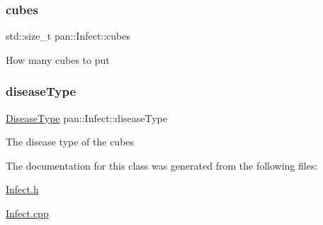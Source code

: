 \subsubsection{\texorpdfstring{cubes}{cubes}}
{\footnotesize\ttfamily std\+::size\+\_\+t pan\+::\+Infect\+::cubes}

How many cubes to put \mbox{\label{classpan_1_1_infect_ad0a1d175916afcaf0f1050edf6536a97}} 
\subsubsection{\texorpdfstring{disease\+Type}{diseaseType}}
{\footnotesize\ttfamily \hyperlink{namespacepan_a48851b51b0aef3f0e1be80df5031d9d7}{Disease\+Type} pan\+::\+Infect\+::disease\+Type}

The disease type of the cubes 

The documentation for this class was generated from the following files\+:\begin{DoxyCompactItemize}
\item 
\hyperlink{_infect_8h}{Infect.\+h}\item 
\hyperlink{_infect_8cpp}{Infect.\+cpp}\end{DoxyCompactItemize}
